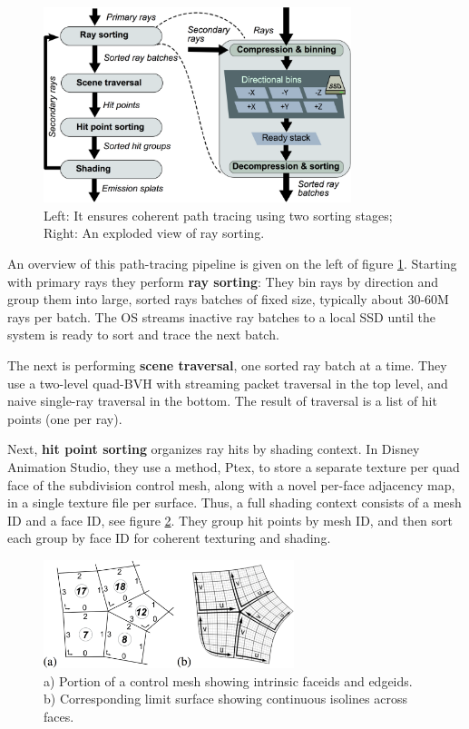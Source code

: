 \begin{figure}\label{f:sorted-deferred-shading}
	\begin{center}
		\includegraphics[width=0.8\textwidth]{graphics/gi/path-10}
	\end{center}
	\caption{Left: It ensures coherent path tracing using two sorting stages; Right: An exploded view of ray sorting.}
\end{figure}

An overview of this path-tracing pipeline is given on the left of figure \ref{f:sorted-deferred-shading}. Starting with primary rays they perform \textbf{ray sorting}: They bin rays by direction and group them into large, sorted rays batches of fixed size, typically about 30-60M rays per batch. The OS streams inactive ray batches to a local SSD until the system is ready to sort and trace the next batch.

The next is performing \textbf{scene traversal}, one sorted ray batch at a time. They use a two-level quad-BVH with streaming packet traversal in the top level, and naive single-ray traversal in the bottom. The result of traversal is a list of hit points (one per ray).

Next, \textbf{hit point sorting} organizes ray hits by shading context. In Disney Animation Studio, they use a method, Ptex\cite[-10mm]{a:Ptex:Per-FaceTextureMappingforProductionRendering}, to store a separate texture per quad face of the subdivision control mesh, along with a novel per-face adjacency map, in a single texture file per surface. Thus, a full shading context consists of a mesh ID and a face ID, see figure \ref{f:ptex}. They group hit points by mesh ID, and then sort each group by face ID for coherent texturing and shading.

\begin{figure}\label{f:ptex}
	\sidecaption
	\includegraphics[width=0.65\textwidth]{graphics/gi/path-12}
	\caption{a) Portion of a control mesh showing intrinsic faceids and edgeids. b) Corresponding limit surface showing continuous isolines across faces.}
\end{figure}



